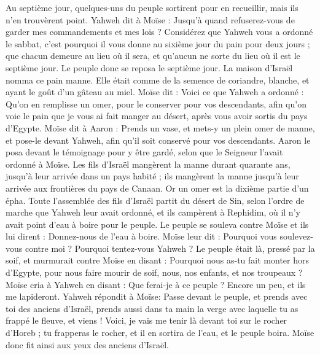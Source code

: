 \begin{multicols}{2}
Au septième jour, quelques-uns du peuple sortirent pour en recueillir, mais ils n'en trouvèrent point.
Yahweh dit à Moïse : Jusqu’à quand refuserez-vous de garder mes commandements et mes lois ?
Considérez que Yahweh vous a ordonné le sabbat, c'est pourquoi il vous donne au sixième jour du pain pour deux jours ; que chacun demeure au lieu où il sera, et qu'aucun ne sorte du lieu où il est le septième jour.
Le peuple donc se reposa le septième jour.
La maison d'Israël nomma ce pain manne. Elle était comme de la semence de coriandre, blanche, et ayant le goût d’un gâteau au miel.
Moïse dit : Voici ce que Yahweh a ordonné : Qu'on en remplisse un omer, pour le conserver pour vos descendants, afin qu'on voie le pain que je vous ai fait manger au désert, après vous avoir sortis du pays d'Egypte.
Moïse dit à Aaron : Prends un vase, et mets-y un plein omer de manne, et pose-le devant Yahweh, afin qu’il soit conservé pour vos descendants.
Aaron le posa devant le témoignage pour y être gardé, selon que le Seigneur l'avait ordonné à Moïse.
Les fils d'Israël mangèrent la manne durant quarante ans, jusqu'à leur arrivée dans un pays habité ; ils mangèrent la manne jusqu'à leur arrivée aux frontières du pays de Canaan.
Or un omer est la dixième partie d'un épha.
\VerseOne{}Toute l'assemblée des fils d'Israël partit du désert de Sin, selon l’ordre de marche que Yahweh leur avait ordonné, et ils campèrent à Rephidim, où il n'y avait point d'eau à boire pour le peuple.
Le peuple se souleva contre Moïse et ils lui dirent : Donnez-nous de l'eau à boire. Moïse leur dit : Pourquoi vous soulevez-vous contre moi ? Pourquoi tentez-vous Yahweh ?
Le peuple était là, pressé par la soif, et murmurait contre Moïse en disant : Pourquoi nous as-tu fait monter hors d'Egypte, pour nous faire mourir de soif, nous, nos enfants, et nos troupeaux ?
Moïse cria à Yahweh en disant : Que ferai-je à ce peuple ? Encore un peu, et ils me lapideront.
Yahweh répondit à Moïse: Passe devant le peuple, et prends avec toi des anciens d'Israël, prends aussi dans ta main la verge avec laquelle tu as frappé le fleuve, et viens !
Voici, je vais me tenir là devant toi sur le rocher d’Horeb ; tu frapperas le rocher, et il en sortira de l’eau, et le peuple boira. Moïse donc fit ainsi aux yeux des anciens d'Israël.

\end{multicols}
